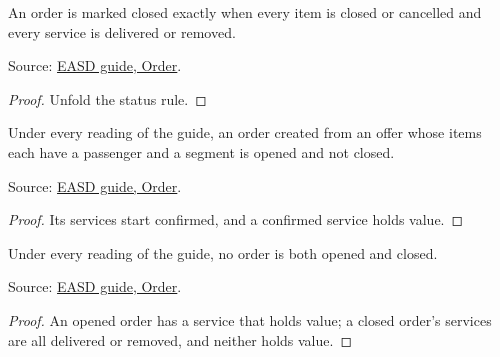 \begin{theorem}
  \label{thm:one-order-closed}
  An order is marked closed exactly when every item is closed or cancelled
  and every service is delivered or removed.

  Source: \href{https://standards.atlassian.net/wiki/spaces/EASD/pages/574849062/Order}{EASD guide, Order}.
\end{theorem}
\begin{proof}
  Unfold the status rule.
\end{proof}

\begin{theorem}
  \label{thm:one-new-order-opened}
  Under every reading of the guide, an order created from an offer whose
  items each have a passenger and a segment is opened and not closed.

  Source: \href{https://standards.atlassian.net/wiki/spaces/EASD/pages/574849062/Order}{EASD guide, Order}.
\end{theorem}
\begin{proof}
  Its services start confirmed, and a confirmed service holds value.
\end{proof}

\begin{theorem}
  \label{thm:one-order-exclusive}
  Under every reading of the guide, no order is both opened and closed.

  Source: \href{https://standards.atlassian.net/wiki/spaces/EASD/pages/574849062/Order}{EASD guide, Order}.
\end{theorem}
\begin{proof}
  An opened order has a service that holds value; a closed order's services
  are all delivered or removed, and neither holds value.
\end{proof}


